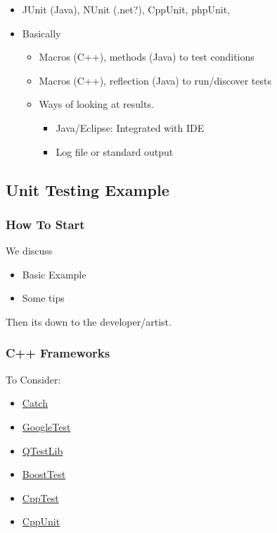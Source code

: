 \begin{itemize}
\tightlist
\item
  JUnit (Java), NUnit (.net?), CppUnit, phpUnit,
\item
  Basically

  \begin{itemize}
  \tightlist
  \item
    Macros (C++), methods (Java) to test conditions
  \item
    Macros (C++), reflection (Java) to run/discover tests
  \item
    Ways of looking at results.

    \begin{itemize}
    \tightlist
    \item
      Java/Eclipse: Integrated with IDE
    \item
      Log file or standard output
    \end{itemize}
  \end{itemize}
\end{itemize}

\hypertarget{unit-testing-example}{%
\subsection{Unit Testing Example}\label{unit-testing-example}}

\hypertarget{how-to-start}{%
\subsubsection{How To Start}\label{how-to-start}}

We discuss

\begin{itemize}
\tightlist
\item
  Basic Example
\item
  Some tips
\end{itemize}

Then its down to the developer/artist.

\hypertarget{c-frameworks}{%
\subsubsection{C++ Frameworks}\label{c-frameworks}}

To Consider:

\begin{itemize}
\tightlist
\item
  \href{https://github.com/philsquared/Catch}{Catch}
\item
  \href{https://code.google.com/p/googletest/}{GoogleTest}
\item
  \href{http://qt-project.org/doc/qt-4.8/qtestlib-manual.html}{QTestLib}
\item
  \href{http://www.boost.org/doc/libs/1_57_0/libs/test/doc/html/index.html}{BoostTest}
\item
  \href{http://cpptest.sourceforge.net/}{CppTest}
\item
  \href{http://sourceforge.net/projects/cppunit/}{CppUnit}
\end{itemize}

